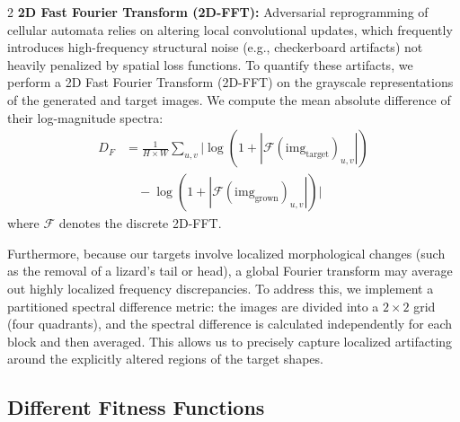 \documentclass{article}
\begin{document}
\begin{multicols}{2}
\textbf{2D Fast Fourier Transform (2D-FFT):} Adversarial reprogramming of cellular automata relies on altering local convolutional updates, which frequently introduces high-frequency structural noise (e.g., checkerboard artifacts) not heavily penalized by spatial loss functions. To quantify these artifacts, we perform a 2D Fast Fourier Transform (2D-FFT) on the grayscale representations of the generated and target images. We compute the mean absolute difference of their log-magnitude spectra:
\begin{equation*}
\begin{split}
    D_{F} &= \frac{1}{H \times W} \sum_{u,v} \Big| \log(1 + |\mathcal{F}(\text{img}_{\text{target}})_{u,v}|) \\
    &\quad - \log(1 + |\mathcal{F}(\text{img}_{\text{grown}})_{u,v}|) \Big|
\end{split}
\end{equation*}
where $\mathcal{F}$ denotes the discrete 2D-FFT. 

Furthermore, because our targets involve localized morphological changes (such as the removal of a lizard's tail or head), a global Fourier transform may average out highly localized frequency discrepancies. To address this, we implement a partitioned spectral difference metric: the images are divided into a $2 \times 2$ grid (four quadrants), and the spectral difference is calculated independently for each block and then averaged. This allows us to precisely capture localized artifacting around the explicitly altered regions of the target shapes.



\subsection*{Different Fitness Functions}




\end{multicols}
\end{document}
